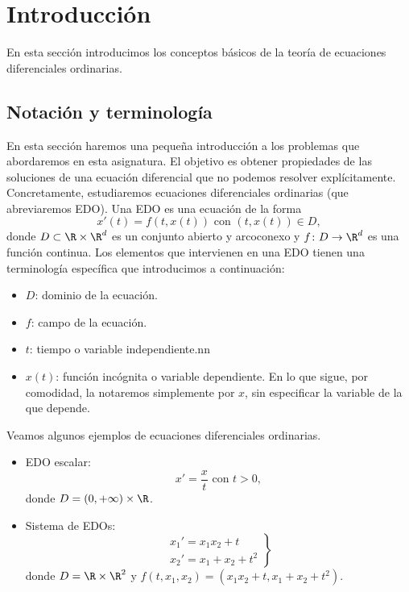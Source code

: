 \documentclass{article}
\begin{document}
\maketitle

\section{Introducción}

En esta sección introducimos los conceptos básicos de la teoría de ecuaciones diferenciales ordinarias.

\subsection{Notación y terminología}

En esta sección haremos una pequeña introducción a los problemas que abordaremos en esta
asignatura. El objetivo es obtener propiedades de las soluciones de una ecuación diferencial que no
podemos resolver explícitamente. Concretamente, estudiaremos ecuaciones diferenciales ordinarias
(que abreviaremos EDO). Una EDO es una ecuación de la forma
\begin{equation}
  \label{eq:edo}
  x'(t) = f(t,x(t)) \text{ con } (t,x(t)) \in D,
  \tag{E}
\end{equation}
donde $D \subset \R \times \R^d$ es un conjunto abierto y arcoconexo y $f\colon D \to \R^d$ es una
función continua. Los elementos que intervienen en una EDO tienen una terminología específica que
introducimos a continuación:

\begin{itemize}
\item $D$: dominio de la ecuación.
\item $f$: campo de la ecuación.
\item $t$: tiempo o variable independiente.nn
\item $x(t)$: función incógnita o variable dependiente. En lo que sigue, por comodidad, la notaremos
  simplemente por $x$, sin especificar la variable de la que depende.
\end{itemize}

\begin{ex} \label{ex:ex} Veamos algunos ejemplos de ecuaciones diferenciales ordinarias.
  
  \begin{itemize}
  \item EDO escalar:
    \[x' = \frac{x}{t} \text{ con } t > 0,\] donde $D = (0, +\infty) \times \R$.
  \item Sistema de EDOs:
    \[
      \left.
        \begin{array}{r}
          x_1' = x_1x_2 + t \\
          x_2' = x_1 + x_2 + t^2
        \end{array}
      \right\}
    \]
    donde $D = \R \times \R^2$ y $f(t, x_1, x_2) = (x_1x_2 + t, x_1 + x_2 + t^2)$. \qedhere
  \end{itemize}
\end{ex}
\end{document}
